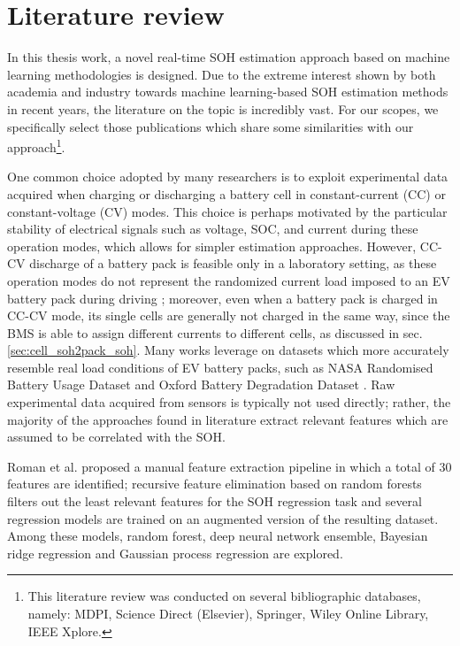 \section{Literature review}
\label{sec:literature_review}
In this thesis work, a novel real-time SOH estimation approach based on machine learning methodologies is designed. Due to the extreme interest shown by both academia and industry towards machine learning-based SOH estimation methods in recent years, the literature on the topic is incredibly vast. For our scopes, we specifically select those publications which share some similarities with our approach\footnote{This literature review was conducted on several bibliographic databases, namely: MDPI, Science Direct (Elsevier), Springer, Wiley Online Library, IEEE Xplore.}.

\smallskip

One common choice adopted by many researchers is to exploit experimental data acquired when charging \cite{soh_charging1,soh_charging2,soh_charging3,soh_charging4,soh_charging5} or discharging \cite{soh_discharging1,soh_charging3} a battery cell in constant-current (CC) or constant-voltage (CV) modes. This choice is perhaps motivated by the particular stability of electrical signals such as voltage, SOC, and current during these operation modes, which allows for simpler estimation approaches. However, CC-CV discharge of a battery pack is feasible only in a laboratory setting, as these operation modes do not represent the randomized current load imposed to an EV battery pack during driving \cite{discharge_unstable}; moreover, even when a battery pack is charged in CC-CV mode, its single cells are generally not charged in the same way, since the BMS is able to assign different currents to different cells, as discussed in sec. \ref{sec:cell_soh2pack_soh}. Many works leverage on datasets which more accurately resemble real load conditions of EV battery packs, such as NASA Randomised Battery Usage Dataset \cite{nasa_dataset,auto_extr_soh_4,filippo_boni_paper,nasa_dataset_used1,nasa_dataset_used2} and Oxford Battery Degradation Dataset \cite{oxford_dataset,oxford_dataset_used1,oxford_dataset_used2,oxford_dataset_used3}.
Raw experimental data acquired from sensors is typically not used directly; rather, the majority of the approaches found in literature extract relevant features which are assumed to be correlated with the SOH.

Roman et al. \cite{manual_extr_soh_13} proposed a manual feature extraction pipeline in which a total of 30 features are identified; recursive feature elimination based on random forests filters out the least relevant features for the SOH regression task and several regression models are trained on an augmented version of the resulting dataset. Among these models, random forest, deep neural network
ensemble, Bayesian ridge regression and Gaussian process regression are explored.

